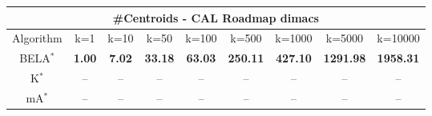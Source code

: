 \begin{tabular}{c|cccccccc}\toprule
\multicolumn{9}{c}{#Centroids - CAL Roadmap dimacs}\\ \midrule
Algorithm & k=1 & k=10 & k=50 & k=100 & k=500 & k=1000 & k=5000 & k=10000 \\ \midrule
BELA$^*$ & \textbf{1.00} & \textbf{7.02} & \textbf{33.18} & \textbf{63.03} & \textbf{250.11} & \textbf{427.10} & \textbf{1291.98} & \textbf{1958.31} \\
K$^*$ & -- & -- & -- & -- & -- & -- & -- & -- \\
mA$^*$ & -- & -- & -- & -- & -- & -- & -- & -- \\ \bottomrule 
\end{tabular}
